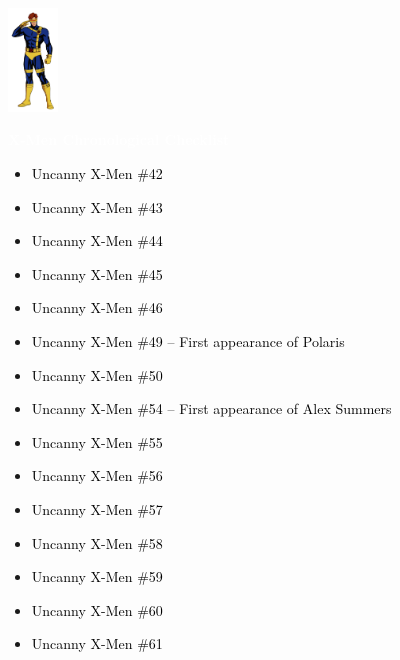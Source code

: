\documentclass[12pt]{article}
\newcommand{\checkbox}{\raisebox{0.0ex}{\fbox{\rule{0ex}{1.5ex} \rule{1.5ex}{0ex}}}}
\begin{document}
\begin{center}
    \vspace*{2cm}
    \includegraphics[width=0.1\textwidth]{cyclops.png}
    \vspace{0.3cm}

    {\Huge \textbf{\textcolor{white}{X-Men Chronological Checklist}}}
\end{center}

\vspace{0.3cm}
\noindent
\begin{tcolorbox}[
  colback=white!95!gray,
  colframe=black,
  width=\textwidth,
  arc=4mm,
  auto outer arc,
  boxrule=0.8pt,
  left=8pt,right=8pt,top=8pt,bottom=8pt
]
\begin{itemize}[left=0pt,label={\checkbox}]
  \item \textcolor{black}{Uncanny X-Men \#42}
  \item \textcolor{black}{Uncanny X-Men \#43}
  \item \textcolor{black}{Uncanny X-Men \#44}
  \item \textcolor{black}{Uncanny X-Men \#45}
  \item \textcolor{black}{Uncanny X-Men \#46}
  \item \textcolor{black}{Uncanny X-Men \#49 – First appearance of Polaris}
  \item \textcolor{black}{Uncanny X-Men \#50}
  \item \textcolor{black}{Uncanny X-Men \#54 – First appearance of Alex Summers}
  \item \textcolor{black}{Uncanny X-Men \#55}
  \item \textcolor{black}{Uncanny X-Men \#56}
  \item \textcolor{black}{Uncanny X-Men \#57}
  \item \textcolor{black}{Uncanny X-Men \#58}
  \item \textcolor{black}{Uncanny X-Men \#59}
  \item \textcolor{black}{Uncanny X-Men \#60}
  \item \textcolor{black}{Uncanny X-Men \#61}
\end{itemize}
\end{tcolorbox}
\end{document}

